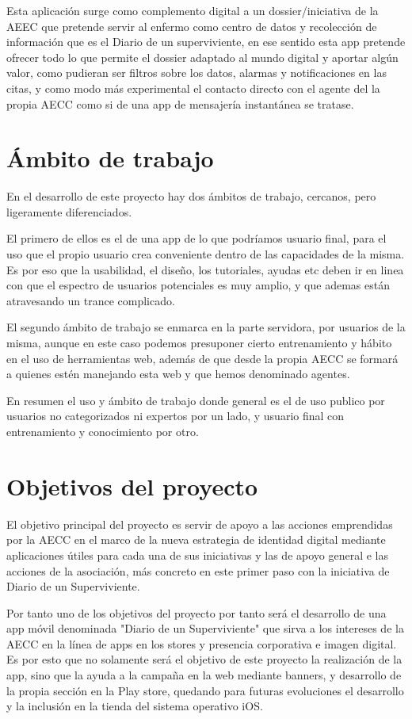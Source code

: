 \documentclass[../pfc.tex]{subfiles}
\begin{document}
Esta aplicación surge como complemento digital a un dossier/iniciativa de la AEEC que pretende servir al enfermo como centro de datos y recolección de información que es el  Diario de un superviviente, en ese sentido esta app pretende ofrecer todo lo que permite el dossier adaptado al mundo digital y aportar algún valor, como pudieran ser filtros sobre los datos, alarmas y notificaciones en las citas, y como modo más experimental el contacto directo con el agente del la propia AECC como si de una app de mensajería instantánea se tratase. 

\section{Ámbito de trabajo}

En el desarrollo de este proyecto hay dos ámbitos de trabajo, cercanos, pero ligeramente diferenciados.

El primero de ellos es el de una app de lo que podríamos usuario final, para el uso que el propio usuario crea conveniente dentro de las capacidades de la misma. Es por eso que la usabilidad, el diseño, los tutoriales, ayudas etc deben ir en linea con que el espectro de usuarios potenciales es muy amplio, y que ademas están atravesando un trance complicado.

El segundo ámbito de trabajo se enmarca en la parte servidora, por usuarios de la misma, aunque en este caso podemos presuponer cierto entrenamiento y hábito en el uso de herramientas web, además de que desde la propia AECC se formará a quienes estén manejando esta web y que hemos denominado agentes.

En resumen el uso y ámbito de trabajo donde general es el de uso publico por usuarios no categorizados ni expertos por un lado, y usuario final con entrenamiento y conocimiento por otro.

\section{Objetivos del proyecto}
El objetivo principal del proyecto es servir de apoyo a las acciones emprendidas por la AECC en el marco de la nueva estrategia de identidad digital mediante aplicaciones útiles para cada una de sus iniciativas y las de apoyo general e las acciones de la asociación, más concreto en este primer paso con la iniciativa de Diario de un Superviviente.

Por tanto uno de los objetivos del proyecto por tanto será el desarrollo de una app móvil denominada "Diario de un Superviviente" que sirva a los intereses de la AECC en la línea de apps en los stores y presencia corporativa e imagen digital. Es por esto que no solamente será el objetivo de este proyecto la realización de la app, sino que la ayuda a la campaña en la web mediante banners, y desarrollo de la propia sección en la Play store, quedando para futuras evoluciones el desarrollo y la inclusión en la tienda del sistema operativo iOS.
\end{document}
